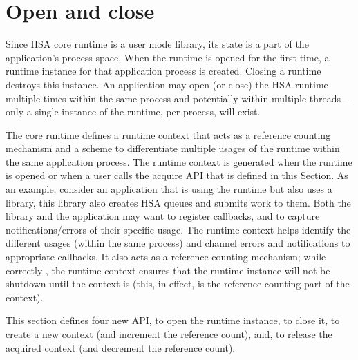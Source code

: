 \DIFdelbegin %
\DIFdelend \DIFaddbegin \begin{DIFnomarkup}
\hypertarget{init}{}\section{Open and close
}\label{init}
\end{DIFnomarkup}
\DIFaddend

Since HSA core runtime is a user mode library, its state is a part
of the application's process space. When the runtime is opened for
the first time, a runtime instance for that application process is
created. Closing a runtime destroys this instance. An application
may open (or close) the HSA runtime multiple times within the same
process and potentially within multiple threads -- only a
single instance of the runtime, per-process, will exist.

The core runtime defines a runtime context that acts as a reference
counting mechanism and a scheme to differentiate multiple usages of
the runtime within the same application process. The runtime context
is generated when the runtime is opened or when a
user calls the acquire API that is defined in this Section. As an
example, consider an application that is using the runtime but also
uses a library, this library also creates HSA queues and submits
work to them. Both the library and the application may want to register
callbacks, and to capture notifications/errors of their specific
usage. The runtime context helps identify the different usages (within
the same process) and channel errors and notifications to
appropriate callbacks. It also acts as a reference counting
mechanism; while correctly , the runtime context
ensures that the runtime instance will not be shutdown until the
context is  (this, in effect, is the reference
counting part of the context).

This section defines four new API,  to open the
runtime instance,  to close it,
 to create a new context (and increment
the reference count), and,  to release
the acquired context (and decrement the reference count).

